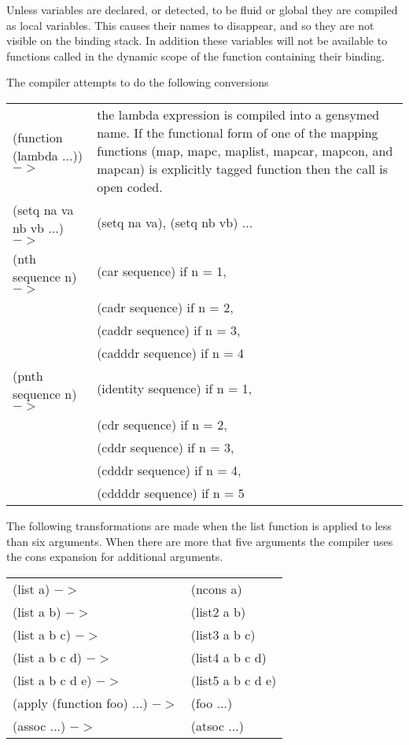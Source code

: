   Unless  variables  are  declared,  or detected, to be fluid or
global they are compiled as local variables. This  causes  their
names  to  disappear, and so they are not visible on the binding
stack. In addition these variables  will  not  be  available  to
functions called in the dynamic scope of the function containing
their binding.

  The compiler attempts to do the following conversions\\

\begin{tabular}{lp{9.0cm}}

    (function  (lambda  ...))    $->$ &   the lambda expression is
     compiled into a gensymed name.
    If the functional form of  one  of  the  mapping  functions
     (map,   mapc,  maplist,  mapcar,  mapcon,  and  mapcan)  is
     explicitly tagged function then the call is open coded.\\

    (setq na va nb vb ...)  $->$ & (setq na va), (setq nb vb) ...\\

 (nth sequence n)  $->$ & (car sequence)  if  n = 1,\\
&                         (cadr sequence)  if  n = 2,\\
&                       (caddr sequence)  if  n = 3,\\
&                       (cadddr sequence)  if  n = 4\\

    (pnth sequence n)  $->$ &  (identity sequence)  if  n = 1,\\
&                           (cdr sequence)  if  n = 2,\\
&                           (cddr sequence)  if  n = 3,\\
&                           (cdddr sequence)  if  n = 4,\\
&                           (cddddr sequence)  if  n = 5\\
\end{tabular}

    The  following  transformations  are  made  when  the  list
     function  is applied to less than six arguments. When there
     are more that five arguments the  compiler  uses  the  cons
     expansion for additional arguments.\\

\begin{tabular}{lp{6.0cm}}
     (list a)  $->$  & (ncons a)\\
     (list a b)  $->$ &  (list2 a b)\\
     (list a b c)  $->$ & (list3 a b c)\\
     (list a b c d)  $->$ &  (list4 a b c d)\\
     (list a b c d e)  $->$ &  (list5 a b c d e)\\

    (apply (function foo) ...)  $->$ &  (foo ...)\\

    (assoc ...)  $->$  & (atsoc ...)\\
\end{tabular}

